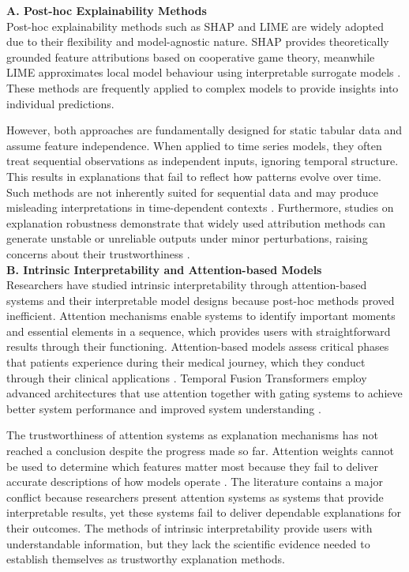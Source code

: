 \documentclass[conference]{IEEEtran}
\begin{document}
\textbf{A.	Post-hoc Explainability Methods}\\
Post-hoc explainability methods such as SHAP and LIME are widely adopted due to their flexibility and model-agnostic nature. SHAP provides theoretically grounded feature attributions based on cooperative game theory, meanwhile LIME approximates local model behaviour using interpretable surrogate models \cite{lundberg2017shap,ribeiro2016lime}. These methods are frequently applied to complex models to provide insights into individual predictions.

However, both approaches are fundamentally designed for static tabular data and assume feature independence. When applied to time series models, they often treat sequential observations as independent inputs, ignoring temporal structure. This results in explanations that fail to reflect how patterns evolve over time. Such methods are not inherently suited for sequential data and may produce misleading interpretations in time-dependent contexts \cite{tschernutter2023timeseriesxai}. Furthermore, studies on explanation robustness demonstrate that widely used attribution methods can generate unstable or unreliable outputs under minor perturbations, raising concerns about their trustworthiness \cite{adebayo2018sanity}.\\

\textbf{B. Intrinsic Interpretability and Attention-based Models}\\
Researchers have studied intrinsic interpretability through attention-based systems and their interpretable model designs because post-hoc methods proved inefficient. Attention mechanisms enable systems to identify important moments and essential elements in a sequence, which provides users with straightforward results through their functioning. Attention-based models assess critical phases that patients experience during their medical journey, which they conduct through their clinical applications \cite{song2018attentive}. Temporal Fusion Transformers employ advanced architectures that use attention together with gating systems to achieve better system performance and improved system understanding \cite{lim2021temporal}.

The trustworthiness of attention systems as explanation mechanisms has not reached a conclusion despite the progress made so far. Attention weights cannot be used to determine which features matter most because they fail to deliver accurate descriptions of how models operate \cite{jain2019attention}. The literature contains a major conflict because researchers present attention systems as systems that provide interpretable results, yet these systems fail to deliver dependable explanations for their outcomes. The methods of intrinsic interpretability provide users with understandable information, but they lack the scientific evidence needed to establish themselves as trustworthy explanation methods.\\
\end{document}
